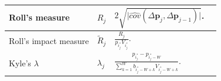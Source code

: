 \documentclass[10pt,a4paper,oneside]{article}
\begin{document}
\begin{longtable}{|p{4cm}|p{2.25cm}|p{5.25cm}|p{2.25cm}|}
    Roll's measure                                                                                                                                                         &
    $R_j$                                                                                                                                                                  &
    $2 \sqrt{\Big| \hat{cov}(\Delta \mathbf{p}_j, \Delta \mathbf{p}_{j - 1}) \Big|}$.                                                                                      &
    \cite{roll1984simple, easley2021microstructure}                                                                                                                                                                                                                                                                                                                                            \\ \hline

    Roll's impact measure                                                                                                                                                  &
    $\tilde{R}_j$                                                                                                                                                          &
    $\frac{R_j}{p_{i^*_j} V_{i^*_j}}$.                                                                                                                                     &
    \cite{roll1984simple, easley2021microstructure}                                                                                                                                                                                                                                                                                                                                            \\ \hline

    Kyle's $\lambda$                                                                                                                                                       &
    $\lambda_j$                                                                                                                                                            &
    $\frac{p_{i^*_j} - p_{i^*_j - W}}{\sum^W_{k = 1} b_{i^*_j - W + k} V_{i^*_j - W + k}}$.                                                                                &
    \cite{Kyle1985, easley2021microstructure}                                                                                                                                                                                                                                                                                                                                                  \\ \hline


\end{longtable}
\end{document}
